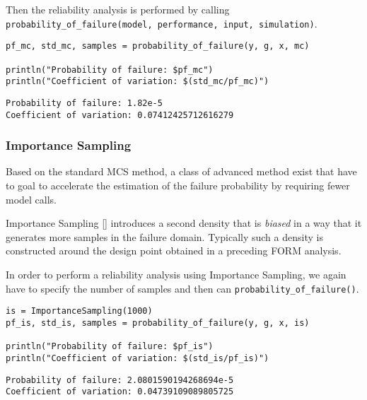 Then the reliability analysis is performed by calling \texttt{probability\_of\_failure(model, performance, input, simulation)}.




\begin{verbatim}
pf_mc, std_mc, samples = probability_of_failure(y, g, x, mc)

println("Probability of failure: $pf_mc")
println("Coefficient of variation: $(std_mc/pf_mc)")
\end{verbatim}


\begin{verbatim}
Probability of failure: 1.82e-5
Coefficient of variation: 0.07412425712616279
\end{verbatim}



\subsubsection{Importance Sampling}



\label{16432856939035910975}{}


Based on the standard MCS method, a class of advanced method exist that have to goal to accelerate the estimation of the failure probability by requiring fewer model calls.



Importance Sampling [] introduces a second density that is \emph{biased} in a way that it generates more samples in the failure domain. Typically such a density is constructed around the design point obtained in a preceding FORM analysis.



In order to perform a reliability analysis using Importance Sampling, we again have to specify the number of samples and then can \texttt{probability\_of\_failure()}.




\begin{verbatim}
is = ImportanceSampling(1000)
pf_is, std_is, samples = probability_of_failure(y, g, x, is)

println("Probability of failure: $pf_is")
println("Coefficient of variation: $(std_is/pf_is)")
\end{verbatim}


\begin{verbatim}
Probability of failure: 2.0801590194268694e-5
Coefficient of variation: 0.04739109089805725
\end{verbatim}



